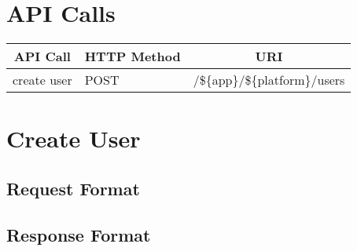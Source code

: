 
\section{API Calls}
\begin{center}
\begin{tabular}{|l||l||l|}
\hline

\multicolumn{1}{|c||}{\textbf{API Call}} &
\multicolumn{1}{c||}{\textbf{HTTP Method}} &
\multicolumn{1}{c|}{\textbf{URI}} \\

\hline
\hline
create user   & POST & /\$\{app\}/\$\{platform\}/users                \\
\hline
\end{tabular}
\end{center}

\section{Create User}
\subsection{Request Format}
\subsection{Response Format}
